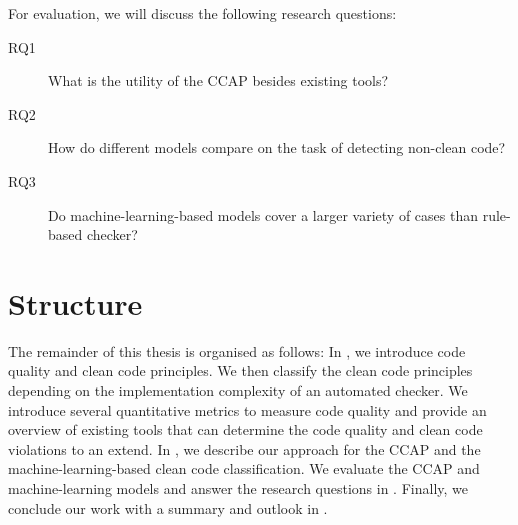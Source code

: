 For evaluation, we will discuss the following research questions:
\begin{description}
    \item[RQ1] What is the utility of the CCAP besides existing tools? 
    \item[RQ2] How do different models compare on the task of detecting non-clean code?
    \item[RQ3] Do machine-learning-based models cover a larger variety of cases than rule-based checker? 
\end{description}


\section{Structure}
The remainder of this thesis is organised as follows: In , we introduce code quality and clean code principles. We then classify the clean code principles depending on the implementation complexity of an automated checker. We introduce several quantitative metrics to measure code quality and provide an overview of existing tools that can determine the code quality and clean code violations to an extend. 
In , we describe our approach for the CCAP and the machine-learning-based clean code classification. We evaluate the CCAP and machine-learning models and answer the research questions in . Finally, we conclude our work with a summary and outlook in .